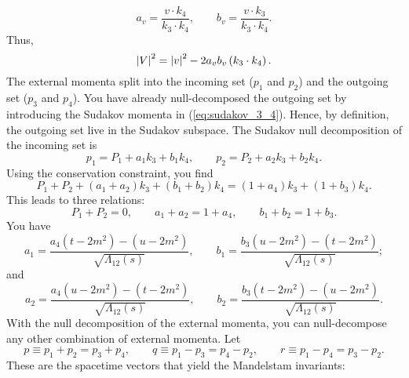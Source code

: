 \begin{equation}
	a_{v} = \frac{v \cdot k_{4}}{k_{3} \cdot k_{4}}, \qquad b_{v} = \frac{v \cdot k_{3}}{k_{3} \cdot k_{4}}.
\end{equation}
Thus,
\begin{equation}
	\left\lvert V \right\rvert^{2} = \left\lvert v \right\rvert^{2} - 2 a_{v} b_{v} \left( k_{3} \cdot k_{4} \right).
\end{equation}
The external momenta split into the incoming set ($p_{1}$ and $p_{2}$) and the outgoing set ($p_{3}$ and $p_{4}$). You have already null-decomposed the outgoing set by introducing the Sudakov momenta in (\ref{eq:sudakov_3_4}). Hence, by definition, the outgoing set live in the Sudakov subspace. The Sudakov null decomposition of the incoming set is
\begin{equation}
	p_{1} = P_{1} + a_{1} k_{3} + b_{1} k_{4}, \qquad p_{2} = P_{2} + a_{2} k_{3} + b_{2} k_{4}.
\end{equation}
Using the conservation constraint, you find
\begin{equation}
	P_{1} + P_{2} + \left( a_{1} + a_{2} \right) k_{3} + \left( b_{1} + b_{2} \right) k_{4} = \left( 1 + a_{4} \right) k_{3} + \left( 1 + b_{3} \right) k_{4}.
\end{equation}
This leads to three relations:
\begin{equation}
	P_{1} + P_{2} = 0, \qquad a_{1} + a_{2} = 1 + a_{4}, \qquad b_{1} + b_{2} = 1 + b_{3}.
	\label{eq:conv_rel}
\end{equation}
You have
\begin{equation}
	a_{1} = \frac{a_{4} \left( t - 2m^{2} \right) - \left( u - 2m^{2} \right) }{\sqrt{\Lambda_{12}(s)}}, \qquad
	b_{1} = \frac{b_{3} \left( u - 2m^{2} \right) - \left( t - 2m^{2} \right) }{\sqrt{\Lambda_{12}(s)}};
\end{equation}
and
\begin{equation}
	a_{2} = \frac{a_{4} \left( u - 2m^{2} \right) - \left( t - 2m^{2} \right) }{\sqrt{\Lambda_{12}(s)}}, \qquad
	b_{2} = \frac{b_{3} \left( t - 2m^{2} \right) - \left( u - 2m^{2} \right) }{\sqrt{\Lambda_{12}(s)}}.
\end{equation}
With the null decomposition of the external momenta, you can null-decompose any other combination of external momenta. Let
\begin{equation}
	p \equiv p_{1} + p_{2} = p_{3} + p_{4}, \qquad q \equiv p_{1} - p_{3} = p_{4} - p_{2}, \qquad r \equiv p_{1} - p_{4} = p_{3} - p_{2}.
\end{equation}
These are the spacetime vectors that yield the Mandelstam invariants:
